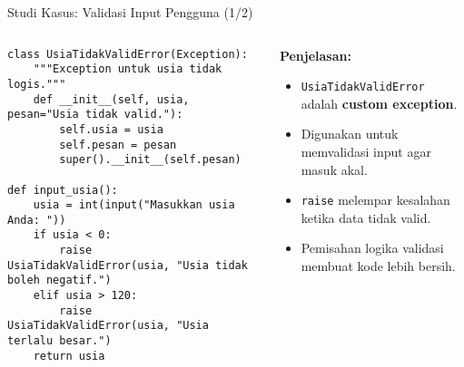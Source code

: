 \documentclass[aspectratio=169, table]{beamer}
\begin{document}
\begin{frame}[fragile]{Studi Kasus: Validasi Input Pengguna (1/2)}
\vspace*{10pt}
\begin{columns}[T,totalwidth=\textwidth]
\begin{column}{0.60\textwidth}
\begin{lstlisting}[style=PythonStyle, basicstyle=\ttfamily\scriptsize]
class UsiaTidakValidError(Exception):
    """Exception untuk usia tidak logis."""
    def __init__(self, usia, pesan="Usia tidak valid."):
        self.usia = usia
        self.pesan = pesan
        super().__init__(self.pesan)

def input_usia():
    usia = int(input("Masukkan usia Anda: "))
    if usia < 0:
        raise UsiaTidakValidError(usia, "Usia tidak boleh negatif.")
    elif usia > 120:
        raise UsiaTidakValidError(usia, "Usia terlalu besar.")
    return usia
\end{lstlisting}
\end{column}

\begin{column}{0.35\textwidth}
\small
\textbf{Penjelasan:}
\begin{itemize}
  \item \texttt{UsiaTidakValidError} adalah \textbf{custom exception}.
  \item Digunakan untuk memvalidasi input agar masuk akal.
  \item \texttt{raise} melempar kesalahan ketika data tidak valid.
  \item Pemisahan logika validasi membuat kode lebih bersih.
\end{itemize}
\end{column}
\end{columns}
\end{frame}
\end{document}
